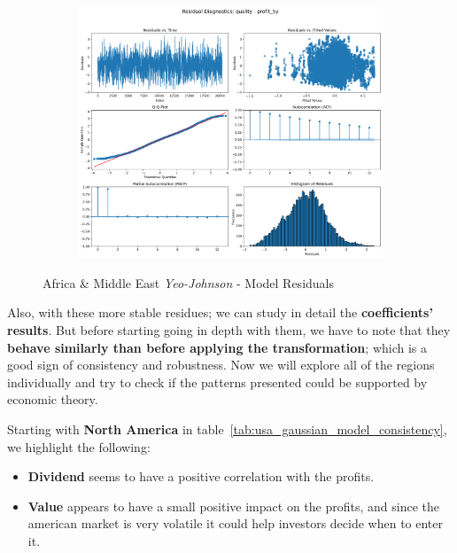 \documentclass[11pt,english,a4paper,hidelinks]{book}
\begin{document}
\begin{figure}[H]
\begin{subfigure}[b]{0.32\textwidth}
    \end{subfigure}
    \hfill
    \begin{subfigure}[b]{0.32\textwidth}
        \centering
        \includegraphics[width=\textwidth]{images/code/models/linear_regression/first_model/AF/quality_profit_5y_residuals - Gaussian.png}
    \end{subfigure}
    \caption{Africa \& Middle East \textit{Yeo-Johnson} - Model Residuals}
    \label{fig:linear_regression_AF_residues_gaussian}
\end{figure}


\noindent Also, with these more stable residues; we can study in detail the \textbf{coefficients' results}. But before starting going in depth with them, we have to note that they \textbf{behave similarly than before applying the transformation}; which is a good sign of consistency and robustness. Now we will explore all of the regions individually and try to check if the patterns presented could be supported by economic theory.

\vspace{0.5cm}
\noindent Starting with \textbf{North America} in table~\ref{tab:usa_gaussian_model_consistency}, we highlight the following:
\begin{itemize}
    \item \textbf{Dividend} seems to have a positive correlation with the profits.
    \item \textbf{Value} appears to have a small positive impact on the profits, and since the american market is very volatile it could help investors decide when to enter it.
\end{itemize}
\end{document}
